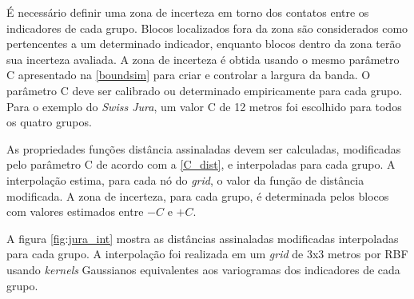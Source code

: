 É necessário definir uma zona de incerteza em torno dos contatos entre os indicadores de cada grupo. Blocos localizados fora da zona são considerados como pertencentes a um determinado indicador, enquanto blocos dentro da zona terão sua incerteza avaliada. A zona de incerteza é obtida usando o mesmo parâmetro C apresentado na \autoref{boundsim} para criar e controlar a largura da banda. O parâmetro C deve ser calibrado ou determinado empiricamente para cada grupo. Para o exemplo do \textit{Swiss Jura}, um valor C de 12 metros foi escolhido para todos os quatro grupos.

As propriedades funções distância assinaladas devem ser calculadas, modificadas pelo parâmetro C de acordo com a \autoref{C_dist}, e interpoladas para cada grupo. A interpolação estima, para cada nó do \textit{grid}, o valor da função de distância modificada. A zona de incerteza, para cada grupo, é determinada pelos blocos com valores estimados entre $ -C $ e $ + C $.

A figura \autoref{fig:jura_int} mostra as distâncias assinaladas modificadas interpoladas para cada grupo. A interpolação foi realizada em um \textit{grid} de 3x3 metros por RBF usando \textit{kernels} Gaussianos equivalentes aos variogramas dos indicadores de cada grupo.

